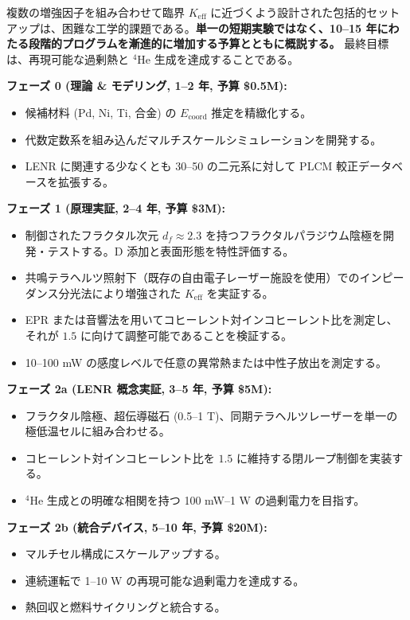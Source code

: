 \documentclass[12pt]{article}
\newcommand{\Keff}{K_{\mathrm{eff}}}
\theoremstyle{remark}
\begin{document}
	複数の増強因子を組み合わせて臨界 \(\Keff\) に近づくよう設計された包括的セットアップは、困難な工学的課題である。\textbf{単一の短期実験ではなく、10–15 年にわたる段階的プログラムを漸進的に増加する予算とともに概説する。} 最終目標は、再現可能な過剰熱と \(^4\)He 生成を達成することである。
	
	\textbf{フェーズ 0 (理論 \& モデリング, 1–2 年, 予算 \$0.5M):}
	\begin{itemize}
		\item 候補材料 (Pd, Ni, Ti, 合金) の \(E_{\mathrm{coord}}\) 推定を精緻化する。
		\item 代数定数系を組み込んだマルチスケールシミュレーションを開発する。
		\item LENR に関連する少なくとも 30–50 の二元系に対して PLCM 較正データベースを拡張する。
	\end{itemize}
	
	\textbf{フェーズ 1 (原理実証, 2–4 年, 予算 \$3M):}
	\begin{itemize}
		\item 制御されたフラクタル次元 \(d_f \approx 2.3\) を持つフラクタルパラジウム陰極を開発・テストする。D 添加と表面形態を特性評価する。
		\item 共鳴テラヘルツ照射下（既存の自由電子レーザー施設を使用）でのインピーダンス分光法により増強された \(\Keff\) を実証する。
		\item EPR または音響法を用いてコヒーレント対インコヒーレント比を測定し、それが \(1.5\) に向けて調整可能であることを検証する。
		\item 10–100 mW の感度レベルで任意の異常熱または中性子放出を測定する。
	\end{itemize}
	
	\textbf{フェーズ 2a (LENR 概念実証, 3–5 年, 予算 \$5M):}
	\begin{itemize}
		\item フラクタル陰極、超伝導磁石 (0.5–1 T)、同期テラヘルツレーザーを単一の極低温セルに組み合わせる。
		\item コヒーレント対インコヒーレント比を \(1.5\) に維持する閉ループ制御を実装する。
		\item \(^4\)He 生成との明確な相関を持つ 100 mW–1 W の過剰電力を目指す。
	\end{itemize}
	
	\textbf{フェーズ 2b (統合デバイス, 5–10 年, 予算 \$20M):}
	\begin{itemize}
		\item マルチセル構成にスケールアップする。
		\item 連続運転で 1--10 W の再現可能な過剰電力を達成する。
		\item 熱回収と燃料サイクリングと統合する。
	\end{itemize}
	
\end{document}
